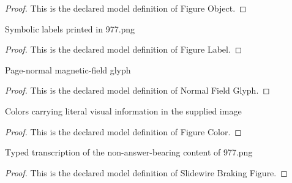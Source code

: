 \begin{proof}
  This is the declared model definition of Figure Object.
\end{proof}
\begin{definition}
  \label{def:physics:phyx-mini-0977:phyxminiproblems-problemphyxmini0977-figurelabel}
  Symbolic labels printed in 977.png
\end{definition}
\begin{proof}
  This is the declared model definition of Figure Label.
\end{proof}
\begin{definition}
  \label{def:physics:phyx-mini-0977:phyxminiproblems-problemphyxmini0977-normalfieldglyph}
  Page-normal magnetic-field glyph
\end{definition}
\begin{proof}
  This is the declared model definition of Normal Field Glyph.
\end{proof}
\begin{definition}
  \label{def:physics:phyx-mini-0977:phyxminiproblems-problemphyxmini0977-figurecolor}
  Colors carrying literal visual information in the supplied image
\end{definition}
\begin{proof}
  This is the declared model definition of Figure Color.
\end{proof}
\begin{definition}
  \label{def:physics:phyx-mini-0977:phyxminiproblems-problemphyxmini0977-slidewirebrakingfigure}
  Typed transcription of the non-answer-bearing content of 977.png
\end{definition}
\begin{proof}
  This is the declared model definition of Slidewire Braking Figure.
\end{proof}
